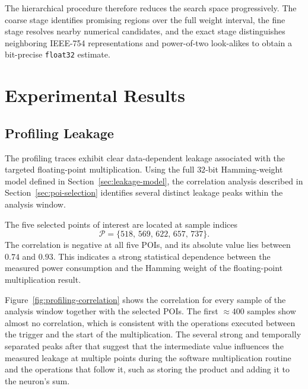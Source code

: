 \documentclass[conference]{IEEEtran}
\begin{document}
The hierarchical procedure therefore reduces the search space progressively.
The coarse stage identifies promising regions over the full weight interval, the fine stage resolves nearby numerical candidates, and the exact stage distinguishes neighboring IEEE-754 representations and power-of-two look-alikes to obtain a bit-precise \texttt{float32} estimate.

\section{Experimental Results}
\label{sec:evaluation}

\subsection{Profiling Leakage}
\label{sec:profiling-leakage}

The profiling traces exhibit clear data-dependent leakage associated with the targeted floating-point multiplication.
Using the full $32$-bit Hamming-weight model defined in Section~\ref{sec:leakage-model}, the correlation analysis described in Section~\ref{sec:poi-selection} identifies several distinct leakage peaks within the analysis window.

The five selected points of interest are located at sample indices
\begin{equation*}
	\mathcal{P} =
	\{518,\,569,\,622,\,657,\,737\}.
\end{equation*}
The correlation is negative at all five POIs, and its absolute value lies between $0.74$ and $0.93$.
This indicates a strong statistical dependence between the measured power consumption and the Hamming weight of the floating-point multiplication result.

Figure~\ref{fig:profiling-correlation} shows the correlation for every sample of the analysis window together with the selected POIs.
The first $\approx 400$ samples show almost no correlation, which is consistent with the operations executed between the trigger and the start of the multiplication.
The several strong and temporally separated peaks after that suggest that the intermediate value influences the measured leakage at multiple points during the software multiplication routine and the operations that follow it, such as storing the product and adding it to the neuron's sum.
\end{document}
